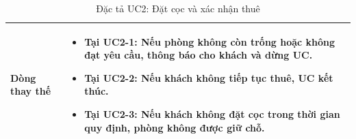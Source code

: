 \begin{table}[H]
\begin{tabularx}{\textwidth}{|>{\centering\arraybackslash\bfseries}m{3.5cm}|X|}
    Dòng thay thế &
    \vspace{0.2cm}
    \begin{itemize}[leftmargin=*, nosep, label=-]
        \item \textbf{Tại UC2-1:} Nếu phòng không còn trống hoặc không đạt yêu cầu, thông báo cho khách và dừng UC.
        \item \textbf{Tại UC2-2:} Nếu khách không tiếp tục thuê, UC kết thúc.
        \item \textbf{Tại UC2-3:} Nếu khách không đặt cọc trong thời gian quy định, phòng không được giữ chỗ.
    \end{itemize} \\ 
    \hline
\end{tabularx}
\caption{Đặc tả UC2: Đặt cọc và xác nhận thuê}
\end{table}


